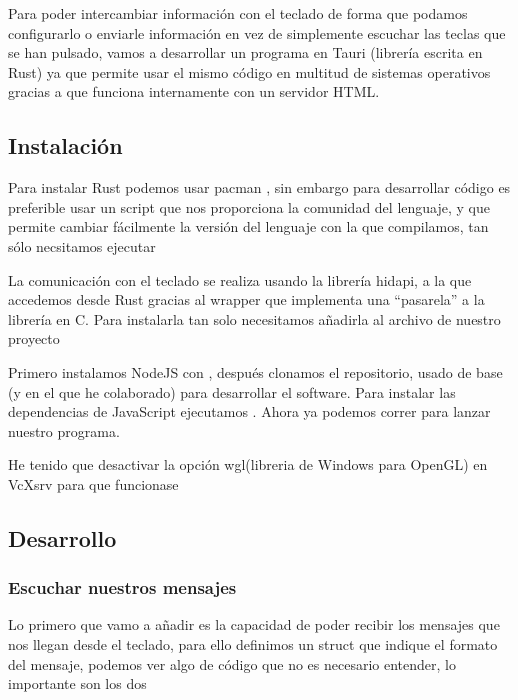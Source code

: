 Para poder intercambiar información con el teclado de forma que podamos configurarlo o enviarle información en vez de simplemente escuchar las teclas que se han pulsado, vamos a desarrollar un programa en Tauri\cite{tauri} (librería escrita en Rust) ya que permite usar el mismo código en multitud de sistemas operativos gracias a que funciona internamente con un servidor HTML. 

\subsection{Instalación}
Para instalar Rust podemos usar pacman , sin embargo para desarrollar código es preferible usar un script que nos proporciona la comunidad del lenguaje, y que permite cambiar fácilmente la versión del lenguaje con la que compilamos, tan sólo necsitamos ejecutar\newline
{} \vspace{.1cm}\newline

La comunicación con el teclado se realiza usando la librería hidapi\cite{hidapi}, a la que accedemos desde Rust gracias al wrapper\cite{hidapi-rs} que implementa una ``pasarela'' a la librería en C. Para instalarla tan solo necesitamos añadirla al archivo  de nuestro proyecto \vspace{0.1cm}\newline

Primero instalamos NodeJS con , después clonamos el repositorio\cite{karl-xap}, usado de base (y en el que he colaborado) para desarrollar el software. \newline 
Para instalar las dependencias de JavaScript ejecutamos . Ahora ya podemos correr  para lanzar nuestro programa. \par

\hr
He tenido que desactivar la opción wgl(libreria de Windows para OpenGL) en VcXsrv para que funcionase
\hr

\subsection{Desarrollo}
    \subsubsection{Escuchar nuestros mensajes}
    Lo primero que vamo a añadir es la capacidad de poder recibir los mensajes que nos llegan desde el teclado, para ello definimos un struct que indique el formato del mensaje, podemos ver algo de código que no es necesario entender, lo importante son los dos  \newline

